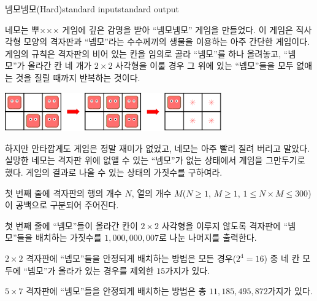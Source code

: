\begin{problem}{넴모넴모(Hard)}{standard input}{standard output}

네모는 뿌××× 게임에 깊은 감명을 받아 ``넴모넴모'' 게임을 만들었다. 이 게임은 직사각형 모양의 격자판과 ``넴모''라는 수수께끼의 생물을 이용하는 아주 간단한 게임이다. 게임의 규칙은 격자판의 비어 있는 칸을 임의로 골라 ``넴모''를 하나 올려놓고, ``넴모''가 올라간 칸 네 개가 $2 \times 2$ 사각형을 이룰 경우 그 위에 있는 ``넴모''들을 모두 없애는 것을 질릴 때까지 반복하는 것이다.

\begin{center}
  \includegraphics[width=0.7\textwidth]{nemo.png}
\end{center}

하지만 안타깝게도 게임은 정말 재미가 없었고, 네모는 아주 빨리 질려 버리고 말았다. 실망한 네모는 격자판 위에 없앨 수 있는 ``넴모''가 없는 상태에서 게임을 그만두기로 했다. 게임의 결과로 나올 수 있는 상태의 가짓수를 구하여라.

\InputFile
첫 번째 줄에 격자판의 행의 개수 $N$, 열의 개수 $M$($N \ge 1$, $M \ge 1$, $1 \le N \times M \le 300$)이 공백으로 구분되어 주어진다.

\OutputFile
첫 번째 줄에 ``넴모''들이 올라간 칸이 $2 \times 2$ 사각형을 이루지 않도록 격자판에 ``넴모''들을 배치하는 가짓수를 $1,000,000,007$로 나눈 나머지를 출력한다.

\Example

\begin{example}
%
%
%
\end{example}

\Notes
$2 \times 2$ 격자판에 ``넴모''들을 안정되게 배치하는 방법은 모든 경우($2^{4}=16$) 중 네 칸 모두에 ``넴모''가 올라가 있는 경우를 제외한 $15$가지가 있다.

$5 \times 7$ 격자판에 ``넴모''들을 안정되게 배치하는 방법은 총 $11,185,495,872$가지가 있다.

\end{problem}
